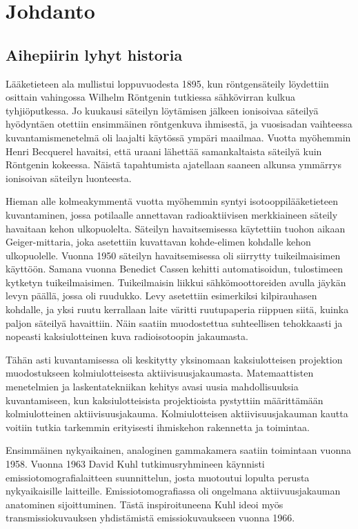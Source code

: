 \section{Johdanto}
\subsection{Aihepiirin lyhyt historia}
Lääketieteen ala mullistui loppuvuodesta 1895, kun röntgensäteily löydettiin osittain vahingossa Wilhelm Röntgenin tutkiessa sähkövirran kulkua tyhjiöputkessa. Jo kuukausi säteilyn löytämisen jälkeen ionisoivaa säteilyä hyödyntäen otettiin ensimmäinen röntgenkuva ihmisestä, ja vuosisadan vaihteessa kuvantamismenetelmä oli laajalti käytössä ympäri maailmaa.\cite{bercovich_medical_2018, cherry_basic_2012} Vuotta myöhemmin Henri Becquerel havaitsi, että uraani lähettää samankaltaista säteilyä kuin Röntgenin kokeessa. Näistä tapahtumista ajatellaan saaneen alkunsa ymmärrys ionisoivan säteilyn luonteesta.\cite{cherry_basic_2012}

Hieman alle kolmeakymmentä vuotta myöhemmin syntyi isotooppilääketieteen kuvantaminen, jossa potilaalle annettavan radioaktiivisen merkkiaineen säteily havaitaan kehon ulkopuolelta. Säteilyn havaitsemisessa käytettiin tuohon aikaan Geiger-mittaria, joka asetettiin kuvattavan kohde-elimen kohdalle kehon ulkopuolelle. Vuonna 1950 säteilyn havaitsemisessa oli siirrytty tuikeilmaisimen käyttöön. Samana vuonna Benedict Cassen kehitti automatisoidun, tulostimeen kytketyn tuikeilmaisimen. Tuikeilmaisin liikkui sähkömoottoreiden avulla jäykän levyn päällä, jossa oli ruudukko. Levy asetettiin esimerkiksi kilpirauhasen kohdalle, ja yksi ruutu kerrallaan laite väritti ruutupaperia riippuen siitä, kuinka paljon säteilyä havaittiin. Näin saatiin muodostettua suhteellisen tehokkaasti ja nopeasti kaksiulotteinen kuva radioisotoopin jakaumasta.\cite{jaszczak_early_2006}

Tähän asti kuvantamisessa oli keskitytty yksinomaan kaksiulotteisen projektion muodostukseen kolmiulotteisesta aktiivisuusjakaumasta. Matemaattisten menetelmien ja laskentatekniikan kehitys avasi uusia mahdollisuuksia kuvantamiseen, kun kaksiulotteisista projektioista pystyttiin määrittämään kolmiulotteinen aktiivisuusjakauma. Kolmiulotteisen aktiivisuusjakauman kautta voitiin tutkia tarkemmin erityisesti ihmiskehon rakennetta ja toimintaa.

Ensimmäinen nykyaikainen, analoginen gammakamera saatiin toimintaan vuonna 1958\cite{hutton_origins_2014}. Vuonna 1963 David Kuhl tutkimusryhmineen käynnisti emissiotomografialaitteen suunnittelun, josta muotoutui lopulta perusta nykyaikaisille laitteille\cite{jaszczak_early_2006, hutton_origins_2014}. Emissiotomografiassa oli ongelmana aktiivuusjakauman anatominen sijoittuminen. Tästä inspiroituneena Kuhl ideoi myös transmissiokuvauksen yhdistämistä emissiokuvaukseen vuonna 1966\cite{jaszczak_early_2006}.

